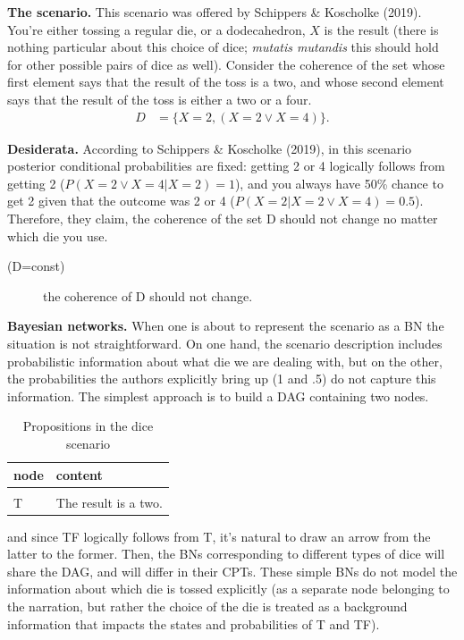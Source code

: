 \documentclass[
  10pt,
]{scrartcl}
\newcommand{\s}[1]{\textsf{#1}}
\begin{document}
\textbf{The scenario.} This scenario was offered by Schippers \& Koscholke (2019). You're either tossing a regular die, or a dodecahedron, \(X\) is the result (there is nothing particular about this choice of dice; \emph{mutatis mutandis} this should hold for other possible pairs of dice as well). Consider the coherence of the set whose first element says that the result of the toss is a two, and whose second element says that the result of the toss is either a two or a four.
\begin{align*} D &= \{X=2, (X=2\vee X=4)\}.\end{align*}

\noindent \textbf{Desiderata.} According to Schippers \& Koscholke (2019), in this scenario posterior conditional probabilities are fixed: getting 2 or 4 logically follows from getting 2 (\(P(X=2\vee X=4|X=2)=1\)), and you always have 50\% chance to get 2 given that the outcome was 2 or 4 (\(P(X=2|X=2\vee X=4)=0.5\)). Therefore, they claim, the coherence of the set \s{D} should not change no matter which die you use.

\vspace{2mm}\begin{description}
    \item[(\s{D=const})] the coherence of \s{D} should not change.
\end{description}\vspace{2mm}

\textbf{Bayesian networks.} When one is about to represent the scenario as a BN the situation is not straightforward. On one hand, the scenario description includes probabilistic information about what die we are dealing with, but on the other, the probabilities the authors explicitly bring up (1 and .5) do not capture this information. The simplest approach is to build a DAG containing two nodes.

\begin{table}[H]

\caption{\label{tab:penguinsDesiderata}Propositions in the dice scenario}
\centering
\begin{tabular}[t]{ll}
\toprule
node & content\\
\midrule
\cellcolor{gray!6}{TF} & \cellcolor{gray!6}{The result is a two or a four.}\\
T & The result is a two.\\
\bottomrule
\end{tabular}
\end{table}

\noindent and since \s{TF} logically follows from \s{T}, it's natural to draw an arrow from the latter to the former. Then, the BNs corresponding to different types of dice will share the DAG, and will differ in their CPTs. These simple BNs do not model the information about which die is tossed explicitly (as a separate node belonging to the narration, but rather the choice of the die is treated as a background information that impacts the states and probabilities of T and TF).
\end{document}
